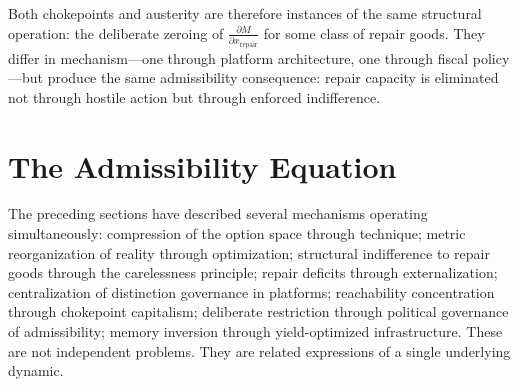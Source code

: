 \documentclass[11pt, letterpaper]{article}
\begin{document}
Both chokepoints and austerity are therefore instances of the same structural operation: the deliberate zeroing of $\frac{\partial M}{\partial x_{\text{repair}}}$ for some class of repair goods. They differ in mechanism---one through platform architecture, one through fiscal policy---but produce the same admissibility consequence: repair capacity is eliminated not through hostile action but through enforced indifference.

\section{The Admissibility Equation}

The preceding sections have described several mechanisms operating simultaneously: compression of the option space through technique; metric reorganization of reality through optimization; structural indifference to repair goods through the carelessness principle; repair deficits through externalization; centralization of distinction governance in platforms; reachability concentration through chokepoint capitalism; deliberate restriction through political governance of admissibility; memory inversion through yield-optimized infrastructure. These are not independent problems. They are related expressions of a single underlying dynamic.
\end{document}
